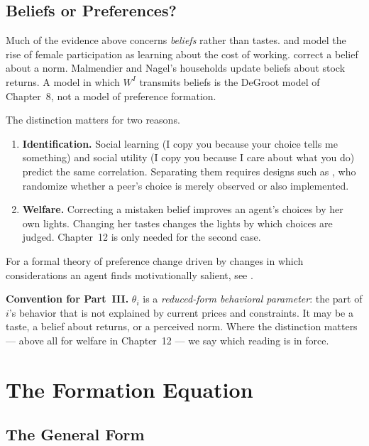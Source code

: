 \documentclass[../structural_economics_book.tex]{subfiles}
\begin{document}
\subsection{Beliefs or Preferences?}
\label{ch09:sec:beliefs}

Much of the evidence above concerns \textit{beliefs} rather than tastes. \citet[\textit{AER}]{fernandez2013cultural} and \citet{fogli2011nature} model the rise of female participation as learning about the cost of working. \citet{bursztyn2020misperceived} correct a belief about a norm. Malmendier and Nagel's households update beliefs about stock returns. A model in which $W^I$ transmits beliefs is the DeGroot model of Chapter~8, not a model of preference formation.

The distinction matters for two reasons.
\begin{enumerate}
\item \textbf{Identification.} Social learning (I copy you because your choice tells me something) and social utility (I copy you because I care about what you do) predict the same correlation. Separating them requires designs such as \citet[\textit{Econometrica}]{bursztyn2014understanding}, who randomize whether a peer's choice is merely observed or also implemented.
\item \textbf{Welfare.} Correcting a mistaken belief improves an agent's choices by her own lights. Changing her tastes changes the lights by which choices are judged. Chapter~12 is only needed for the second case.
\end{enumerate}
For a formal theory of preference change driven by changes in which considerations an agent finds motivationally salient, see \citet{dietrich2013where}.

\textbf{Convention for Part~III.} $\theta_i$ is a \textit{reduced-form behavioral parameter}: the part of $i$'s behavior that is not explained by current prices and constraints. It may be a taste, a belief about returns, or a perceived norm. Where the distinction matters --- above all for welfare in Chapter~12 --- we say which reading is in force.


\section{The Formation Equation}
\label{ch09:sec:formation}

\subsection{The General Form}
\end{document}
